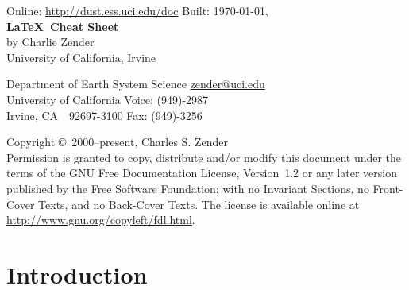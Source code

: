 \documentclass[12pt]{article}
\begin{document}

\ifpdf %
\fi %

\begin{center}
Online: \url{http://dust.ess.uci.edu/doc} \hfill Built: \shortdate\today, \xxivtime\\
\bigskip
{\Large \textbf{\LaTeX\ Cheat Sheet}}\\
\bigskip
by Charlie Zender\\
University of California, Irvine\\
\end{center}
Department of Earth System Science \hfill \url{zender@uci.edu}\\
University of California \hfill Voice: (949)-2987\\
Irvine, CA~~92697-3100 \hfill Fax: (949)-3256

\bigskip\noindent
Copyright \copyright\ 2000--present, Charles S. Zender\\
Permission is granted to copy, distribute and/or modify this document
under the terms of the GNU Free Documentation License, Version~1.2
or any later version published by the Free Software Foundation;
with no Invariant Sections, no Front-Cover Texts, and no Back-Cover
Texts.
The license is available online at
\url{http://www.gnu.org/copyleft/fdl.html}.

\setcounter{page}{1}
\pagestyle{headings}
\thispagestyle{empty}
\tableofcontents
\listoffigures
\listoftables
{}
\setcounter{page}{1}
\thispagestyle{empty}

\section{Introduction}\label{sxn:ntr}
\end{document}
